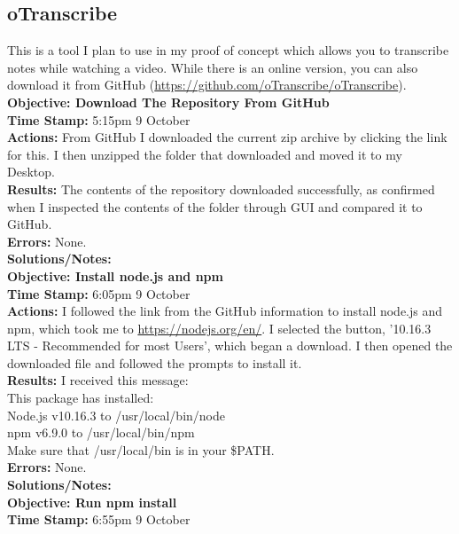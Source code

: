 \documentclass{article}
\begin{document}
\begin{FlushLeft}
\pagebreak

\subsection{oTranscribe}
This is a tool I plan to use in my proof of concept which allows you to transcribe notes while watching a video. While there is an online version, you can also download it from GitHub (\url{https://github.com/oTranscribe/oTranscribe}).
\vspace{5mm}
\textbf{Objective: Download The Repository From GitHub}\\ 
\textbf{Time Stamp:} 5:15pm 9 October\\
\textbf{Actions:} From GitHub I downloaded the current zip archive by clicking the link for this. I then unzipped the folder that downloaded and moved it to my Desktop.\\
\textbf{Results:} The contents of the repository downloaded successfully, as confirmed when I inspected the contents of the folder through GUI and compared it to GitHub.\\
\textbf{Errors:} None.\\
\textbf{Solutions/Notes:}\\
\vspace{5mm}
\textbf{Objective: Install node.js and npm}\\ 
\textbf{Time Stamp:} 6:05pm 9 October\\
\textbf{Actions:} I followed the link from the GitHub information to install node.js and npm, which took me to \url{https://nodejs.org/en/}. I selected the button, '10.16.3 LTS - Recommended for most Users', which began a download. I then opened the downloaded file and followed the prompts to install it.\\
\textbf{Results:} I received this message:\\
This package has installed:\\
Node.js v10.16.3 to /usr/local/bin/node\\
npm v6.9.0 to /usr/local/bin/npm \\
Make sure that /usr/local/bin is in your \$PATH.\\
\textbf{Errors:} None.\\
\textbf{Solutions/Notes:}\\
\vspace{5mm}
\textbf{Objective: Run npm install}\\ 
\textbf{Time Stamp:} 6:55pm 9 October\\

\end{FlushLeft}
\end{document}
